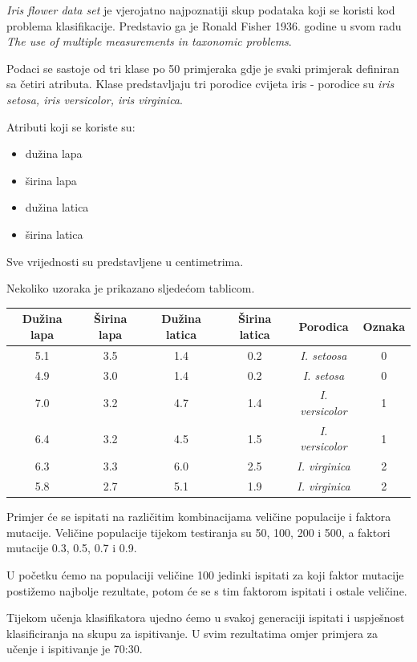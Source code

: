 \documentclass[times, utf8, zavrsni]{fer}
\begin{document}
\textit{Iris flower data set} je vjerojatno najpoznatiji skup podataka koji se koristi kod problema klasifikacije. Predstavio ga je Ronald Fisher 1936. godine u svom radu \textit{The use of multiple measurements in taxonomic problems}.

Podaci se sastoje od tri klase po 50 primjeraka gdje je svaki primjerak definiran sa četiri atributa. Klase predstavljaju tri porodice cvijeta iris - porodice su \textit{iris setosa, iris versicolor, iris virginica}.

Atributi koji se koriste su:
\begin{itemize}
\item dužina lapa
\item širina lapa
\item dužina latica
\item širina latica
\end{itemize}

Sve vrijednosti su predstavljene u centimetrima.

Nekoliko uzoraka je prikazano sljedećom tablicom.

\begin{center}
\begin{tabular}{|c|c|c|c|c|c|}
\hline
Dužina lapa & Širina lapa & Dužina latica & Širina latica & Porodica & Oznaka \\
\hline
5.1 & 3.5 & 1.4 & 0.2 & \textit{I. setoosa} & 0 \\
\hline
4.9 & 3.0 & 1.4 & 0.2 & \textit{I. setosa} & 0\\
\hline
7.0 & 3.2 & 4.7 & 1.4 & \textit{I. versicolor} & 1\\
\hline
6.4 & 3.2 & 4.5 & 1.5 & \textit{I. versicolor} & 1\\
\hline
6.3 & 3.3 & 6.0 & 2.5 & \textit{I. virginica} & 2\\
\hline
5.8 & 2.7 & 5.1 & 1.9 & \textit{I. virginica} & 2\\
\hline
\end{tabular}
\end{center}

Primjer će se ispitati na različitim kombinacijama veličine populacije i faktora mutacije. Veličine populacije tijekom testiranja su 50, 100, 200 i 500, a faktori mutacije 0.3, 0.5, 0.7 i 0.9.

U početku ćemo na populaciji veličine 100 jedinki ispitati za koji faktor mutacije postižemo najbolje rezultate, potom će se s tim faktorom ispitati i ostale veličine.

Tijekom učenja klasifikatora ujedno ćemo u svakoj generaciji ispitati i uspješnost klasificiranja na skupu za ispitivanje. U svim rezultatima omjer primjera za učenje i ispitivanje je 70:30.
\end{document}
